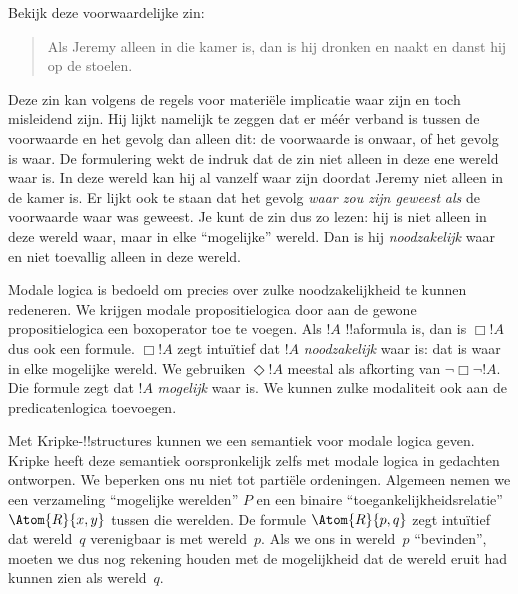 \documentclass[openany]{memoir}
\begin{document}
\begingroup
\def\olfilename{OLP-0180}
\def\olfilepath{content/first-order-logic/beyond/}
\hypertarget{unit-OLP-0180}{}





Bekijk deze voorwaardelijke zin:
\begin{quote}
  Als Jeremy alleen in die kamer is, dan is hij dronken en naakt en
  danst hij op de stoelen.
\end{quote}
Deze zin kan volgens de regels voor materiële implicatie waar zijn en toch
misleidend zijn. Hij lijkt namelijk te zeggen dat er méér verband is tussen de
voorwaarde en het gevolg dan alleen dit: de voorwaarde is onwaar, of het gevolg
is waar. De formulering wekt de indruk dat de zin niet alleen in deze ene wereld
waar is. In deze wereld kan hij al vanzelf waar zijn doordat Jeremy niet alleen
in de kamer is. Er lijkt ook te staan dat het gevolg \emph{waar zou zijn geweest}
\emph{als} de voorwaarde waar was geweest. Je kunt de zin dus zo lezen: hij is
niet alleen in deze wereld waar, maar in elke ``mogelijke'' wereld. Dan is hij
\emph{noodzakelijk} waar en niet toevallig alleen in deze wereld.

Modale logica is bedoeld om precies over zulke noodzakelijkheid te kunnen
redeneren. We krijgen modale propositielogica door aan de gewone
propositielogica een boxoperator toe te voegen. Als $!A$ !!a{formula} is, dan is
$\Box !A$ dus ook een formule. $\Box !A$ zegt intuïtief dat $!A$
\emph{noodzakelijk} waar is: dat is waar in elke mogelijke wereld. We gebruiken
$\Diamond !A$ meestal als afkorting van $\lnot \Box \lnot !A$. Die formule zegt
dat $!A$ \emph{mogelijk} waar is. We kunnen zulke modaliteit ook aan de
predicatenlogica toevoegen.

Met Kripke-!!{structure}s kunnen we een semantiek voor modale logica geven.
Kripke heeft deze semantiek oorspronkelijk zelfs met modale logica in gedachten
ontworpen. We beperken ons nu niet tot partiële ordeningen. Algemeen nemen we
een verzameling ``mogelijke werelden'' $P$ en een binaire
``toegankelijkheidsrelatie'' $\Atom{R}{x,y}$ tussen die werelden. De formule
$\Atom{R}{p,q}$ zegt intuïtief dat wereld~$q$ verenigbaar is met wereld~$p$.
Als we ons in wereld~$p$ ``bevinden'', moeten we dus nog rekening houden met de
mogelijkheid dat de wereld eruit had kunnen zien als wereld~$q$.
\end{document}
